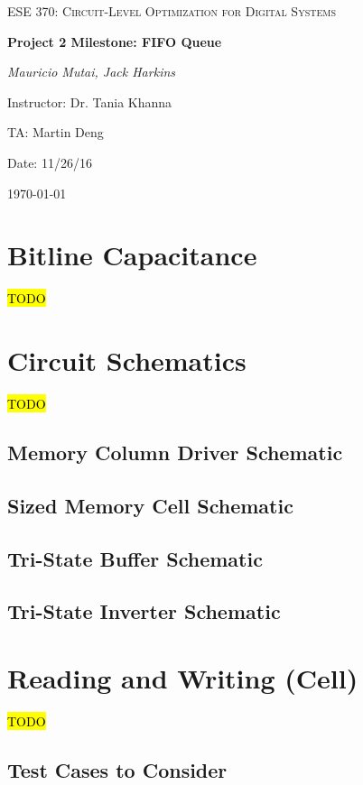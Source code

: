 \documentclass[12pt]{report}
\begin{document}
\begin{titlepage}
	\centering
	\vspace{1cm}
	{\scshape\Large ESE 370: Circuit-Level Optimization for Digital Systems\par}
	\vspace{1.5cm}
	{\huge\bfseries Project 2 Milestone: FIFO Queue\par}
	\vspace{2cm}
	{\Large\itshape Mauricio Mutai, Jack Harkins\par}
	\vfill
	Instructor: Dr. Tania Khanna\par
	TA: Martin Deng\par
	Date: 11/26/16

	\vfill

	{\large \today\par}
\end{titlepage}

\section*{Bitline Capacitance}
\hl{TODO}

\section*{Circuit Schematics}
\hl{TODO}
\subsection*{Memory Column Driver Schematic}

\subsection*{Sized Memory Cell Schematic}

\subsection*{Tri-State Buffer Schematic}

\subsection*{Tri-State Inverter Schematic}


\section*{Reading and Writing (Cell)}
\hl{TODO}
\subsection*{Test Cases to Consider}
\end{document}
